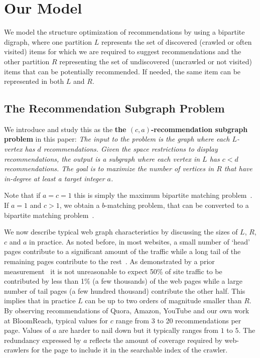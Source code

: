 \section{Our Model}

We model the structure optimization of recommendations by using a bipartite
digraph, where one partition $L$ represents the set of discovered (crawled or often visited) items for which
we are required to suggest recommendations and the other partition $R$
representing the set of undiscovered (uncrawled or not visited) items that can be potentially recommended. If
needed, the same item can be represented in both $L$ and $R$.
\vs

\subsection{The Recommendation Subgraph Problem}
We introduce and study this as the {\bf the $(c, a)$-recommendation subgraph problem} in this paper:
{\em
 The input to the problem is the graph where each
$L$-vertex has $d$ recommendations. Given the space restrictions to
display recommendations, the output is a subgraph where each vertex in
$L$ has $c < d$ recommendations. The goal is to maximize the number of
vertices in $R$ that have in-degree at least a target integer $a$.
}

\vs

Note that if $a=c=1$ this is simply the maximum bipartite
matching problem~\cite{LovaszPlummer1986}. If $a=1$ and $c > 1$, we
obtain a $b$-matching problem, that can be converted to a bipartite
matching problem~\cite{Gabow1983}.\vs

We now describe typical web graph characteristics by discussing the sizes of $L$, $R$, $c$ and $a$ in practice. As noted before, in most websites, a small number of `head' pages contribute to a significant amount of the traffic while a long tail of the remaining pages contribute to the rest~\cite{HubermanAdamic1999,
  DuDemmerBrewer2006}. As demonstrated by a prior
measurement~\cite{KumarNorrisSun2009} it is not unreasonable to expect
50\% of site traffic to be contributed by less than 1\% (a few
thousands) of the web pages while a large number of tail pages (a few
hundred thousand) contribute the other half. This implies that in
practice $L$ can be up to two orders of magnitude smaller than $R$.
By observing recommendations of Quora, Amazon, YouTube and our own
work at BloomReach, typical values for $c$ range from 3 to 20 recommendations per
page. Values of $a$ are harder to nail down but it typically ranges
from $1$ to $5$. The redundancy expressed by $a$ reflects the amount of coverage required by web-crawlers for the page to include it in the searchable index of the crawler.
\vs

